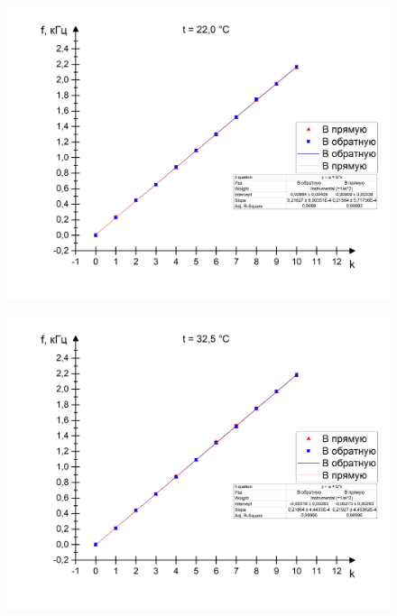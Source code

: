 \documentclass[a4paper, 12pt]{article} %
\begin{document}
\begin{figure}
    \begin{center}
        \includegraphics[scale = 0.5]{3}
    \end{center}
\end{figure}

\begin{figure}
    \begin{center}
        \includegraphics[scale = 0.5]{4}
    \end{center}
\end{figure}
\end{document}
